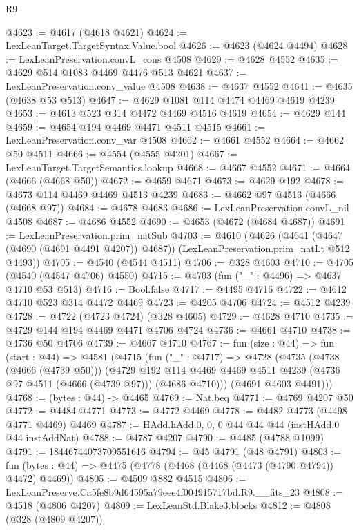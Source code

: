 \begin{lexlean}{R9}
\begin{coremodule}
@4623 := @4617 (@4618 @4621)
@4624 := LexLeanTarget.TargetSyntax.Value.bool
@4626 := @4623 (@4624 @4494)
@4628 := LexLeanPreservation.convL_cons @4508
@4629 := @4628 @4552
@4635 := @4629 @514 @1083 @4469 @4476 @513 @4621
@4637 := LexLeanPreservation.conv_value @4508
@4638 := @4637 @4552
@4641 := @4635 (@4638 @53 @513)
@4647 := @4629 @1081 @114 @4474 @4469 @4619 @4239
@4653 := @4613 @523 @314 @4472 @4469 @4516 @4619
@4654 := @4629 @144
@4659 := @4654 @194 @4469 @4471 @4511 @4515
@4661 := LexLeanPreservation.conv_var @4508
@4662 := @4661 @4552
@4664 := @4662 @50 @4511
@4666 := @4554 (@4555 @4201)
@4667 := LexLeanTarget.TargetSemantics.lookup
@4668 := @4667 @4552
@4671 := @4664 (@4666 (@4668 @50))
@4672 := @4659 @4671
@4673 := @4629 @192
@4678 := @4673 @114 @4469 @4469 @4513 @4239
@4683 := @4662 @97 @4513 (@4666 (@4668 @97))
@4684 := @4678 @4683
@4686 := LexLeanPreservation.convL_nil @4508
@4687 := @4686 @4552
@4690 := @4653 (@4672 (@4684 @4687))
@4691 := LexLeanPreservation.prim_natSub
@4703 := @4610
    (@4626
      (@4641 (@4647 (@4690 (@4691 @4491 @4207)) @4687))
      (LexLeanPreservation.prim_natLt @512 @4493))
@4705 := @4540 (@4544 @4511)
@4706 := @328 @4603
@4710 := @4705 (@4540 (@4547 @4706) @4550)
@4715 := @4703 (fun ("_" : @4496) => @4637 @4710 @53 @513)
@4716 := Bool.false
@4717 := @4495 @4716
@4722 := @4612 @4710 @523 @314 @4472 @4469
@4723 := @4205 @4706
@4724 := @4512 @4239
@4728 := @4722 (@4723 @4724) (@328 @4605)
@4729 := @4628 @4710
@4735 := @4729 @144 @194 @4469 @4471 @4706 @4724
@4736 := @4661 @4710
@4738 := @4736 @50 @4706
@4739 := @4667 @4710
@4767 := fun (size : @44) =>
  fun (start : @44) =>
  @4581
    (@4715
      (fun ("_" : @4717) =>
      @4728
        (@4735
          (@4738 (@4666 (@4739 @50)))
          (@4729
            @192
            @114
            @4469
            @4469
            @4511
            @4239
            (@4736 @97 @4511 (@4666 (@4739 @97)))
            (@4686 @4710)))
        (@4691 @4603 @4491)))
@4768 := (bytes : @44) -> @4465
@4769 := Nat.beq
@4771 := @4769 @4207 @50
@4772 := @4484 @4771
@4773 := @4772 @4469
@4778 := @4482 @4773 (@4498 @4771 @4469) @4469
@4787 := HAdd.hAdd.{0, 0, 0} @44 @44 @44 (instHAdd.{0} @44 instAddNat)
@4788 := @4787 @4207
@4790 := @4485 (@4788 @1099)
@4791 := 18446744073709551616
@4794 := @45 @4791 (@48 @4791)
@4803 := fun (bytes : @44) => @4475 (@4778 (@4468 (@4468 (@4473 (@4790 @4794)) @4472) @4469))
@4805 := @4509 @882 @4515
@4806 := LexLeanPreserve.Ca5fe8b9d64595a79eee4f004915717bd.R9.__fits_23
@4808 := @4518 (@4806 @4207)
@4809 := LexLeanStd.Blake3.blocks
@4812 := @4808 (@328 (@4809 @4207))

\end{coremodule}
\end{lexlean}
